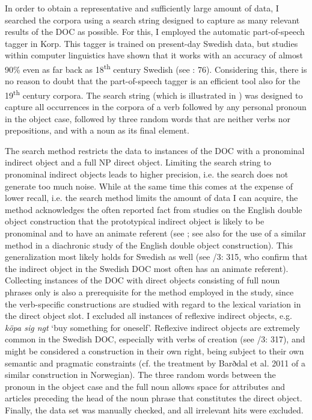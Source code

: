 \documentclass[output=paper]{langscibook}
\begin{document}
In order to obtain a representative and sufficiently large amount of data, I searched the corpora using a search string designed to capture as many relevant results of the DOC as possible. For this, I employed the automatic part-of-speech tagger in Korp. This tagger is trained on present-day Swedish data, but studies within computer linguistics have shown that it works with an accuracy of almost 90\% even as far back as 18\textsuperscript{th} century Swedish (see \citealt{AdesamEtAl2016}: 76). Considering this, there is no reason to doubt that the part-of-speech tagger is an efficient tool also for the 19\textsuperscript{th} century corpora. The search string (which is illustrated in ) was designed to capture all occurrences in the corpora of a verb followed by any personal pronoun in the object case, followed by three random words that are neither verbs nor prepositions, and with a noun as its final element.



The search method restricts the data to instances of the DOC with a pronominal indirect object and a full NP direct object. Limiting the search string to pronominal indirect objects leads to higher precision, i.e. the search does not generate too much noise. While at the same time this comes at the expense of lower recall, i.e. the search method limits the amount of data I can acquire, the method acknowledges the often reported fact from studies on the English double object construction that the prototypical indirect object is likely to be pronominal and to have an animate referent (see \citealt{BresnanEtAl2007}; see also \citealt{CollemanDe_Clerck2011} for the use of a similar method in a diachronic study of the English double object construction). This generalization most likely holds for Swedish as well (see \citealt{TelemanEtAl1999}/3: 315, who confirm that the indirect object in the Swedish DOC most often has an animate referent). Collecting instances of the DOC with direct objects consisting of full noun phrases only is also a prerequisite for the method employed in the study, since the verb-specific constructions are studied with regard to the lexical variation in the direct object slot. I excluded all instances of reflexive indirect objects, e.g. \textit{köpa sig ngt} ‘buy something for oneself’. Reflexive indirect objects are extremely common in the Swedish DOC, especially with verbs of creation (see \citealt{TelemanEtAl1999}/3: 317), and might be considered a construction in their own right, being subject to their own semantic and pragmatic constraints (cf. the treatment by Barðdal et al. 2011 of a similar construction in Norwegian). The three random words between the pronoun in the object case and the full noun allows space for attributes and articles preceding the head of the noun phrase that constitutes the direct object. Finally, the data set was manually checked, and all irrelevant hits were excluded.
\end{document}
